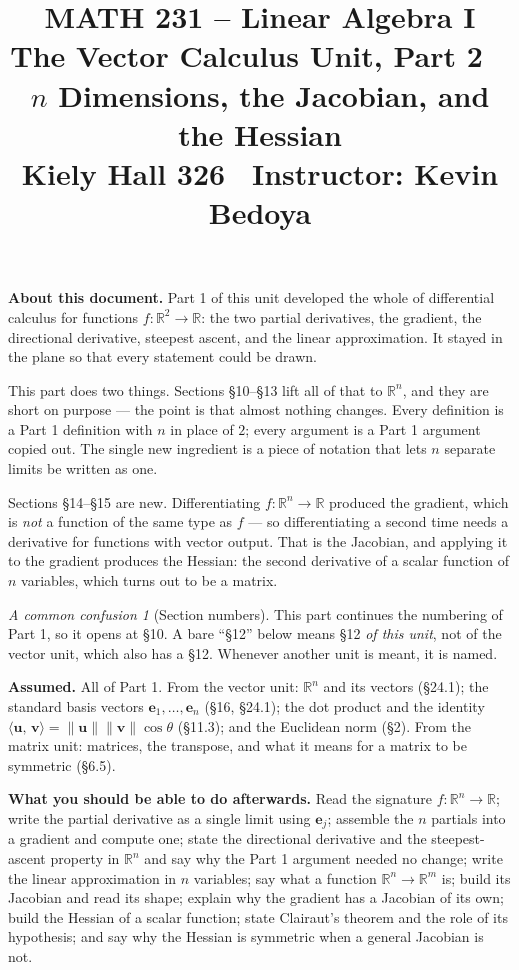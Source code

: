 \documentclass[11pt]{article}
\title{\vspace{-1.2cm}\textbf{\sffamily MATH 231 -- Linear Algebra I}\\[4pt]
       {\large\sffamily The Vector Calculus Unit, Part 2 \textbullet\
        $n$ Dimensions, the Jacobian, and the Hessian}\\[2pt]
       {\normalsize\sffamily Kiely Hall 326 \textbullet\
        Instructor: Kevin Bedoya}}
\author{}
\date{}
\theoremstyle{plain}
\theoremstyle{definition}
\theoremstyle{remark}
\newtheorem*{warn}{A common confusion}
\newcommand{\R}{\mathbb{R}}
\newcommand{\vc}[1]{\mathbf{#1}}
\newcommand{\norm}[1]{\lVert #1\rVert}
\newcommand{\ip}[2]{\langle #1,\, #2\rangle}
\begin{document}
\maketitle
\vspace{-1.6cm}

\noindent\textbf{About this document.} Part 1 of this unit developed the whole
of differential calculus for functions $f:\R^{2}\to\R$: the two partial
derivatives, the gradient, the directional derivative, steepest ascent, and the
linear approximation. It stayed in the plane so that every statement could be
drawn.

This part does two things. Sections \S10--\S13 lift all of that to $\R^{n}$, and
they are short on purpose --- the point is that almost nothing changes. Every
definition is a Part 1 definition with $n$ in place of $2$; every argument is a
Part 1 argument copied out. The single new ingredient is a piece of notation
that lets $n$ separate limits be written as one.

Sections \S14--\S15 are new. Differentiating $f:\R^{n}\to\R$ produced the
gradient, which is \emph{not} a function of the same type as $f$ --- so
differentiating a second time needs a derivative for functions with vector
output. That is the Jacobian, and applying it to the gradient produces the
Hessian: the second derivative of a scalar function of $n$ variables, which
turns out to be a matrix.

\begin{warn}[Section numbers]
This part continues the numbering of Part 1, so it opens at \S10. A bare
``\S12'' below means \S12 \emph{of this unit}, not of the vector unit, which
also has a \S12. Whenever another unit is meant, it is named.
\end{warn}

\medskip
\noindent\textbf{Assumed.} All of Part 1. From the vector unit: $\R^{n}$ and its
vectors (\S24.1); the standard basis vectors $\vc{e}_1,\dots,\vc{e}_n$ (\S16,
\S24.1); the dot product and the identity
$\ip{\vc{u}}{\vc{v}}=\norm{\vc{u}}\norm{\vc{v}}\cos\theta$ (\S11.3); and the
Euclidean norm (\S2). From the matrix unit: matrices, the transpose, and what it
means for a matrix to be symmetric (\S6.5).

\medskip
\noindent\textbf{What you should be able to do afterwards.} Read the signature
$f:\R^{n}\to\R$; write the partial derivative as a single limit using
$\vc{e}_j$; assemble the $n$ partials into a gradient and compute one; state the
directional derivative and the steepest-ascent property in $\R^{n}$ and say why
the Part 1 argument needed no change; write the linear approximation in $n$
variables; say what a function $\R^{n}\to\R^{m}$ is; build its Jacobian and read
its shape; explain why the gradient has a Jacobian of its own; build the Hessian
of a scalar function; state Clairaut's theorem and the role of its hypothesis;
and say why the Hessian is symmetric when a general Jacobian is not.
\end{document}
